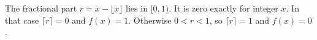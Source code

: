 The fractional part $r=x-\lfloor x\rfloor$ lies in $[0,1)$. It is zero exactly for integer $x$. In that case $\lceil r\rceil=0$ and $f(x)=1$. Otherwise $0<r<1$, so $\lceil r\rceil=1$ and $f(x)=0$.
